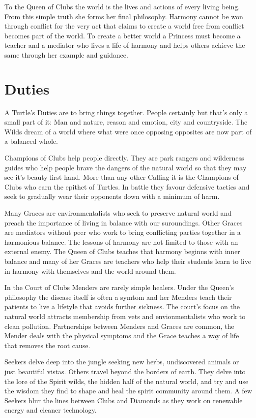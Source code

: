 To the Queen of Clubs the world is the lives and actions of every living being. From this simple truth she forms her final philosophy. Harmony cannot be won through conflict for the very act that claims to create a world free from conflict becomes part of the world. To create a better world a Princess must become a teacher and a mediator who lives a life of harmony and helps others achieve the same through her example and guidance. 

\section*{Duties}

A Turtle's Duties are to bring things together. People certainly but that's only a small part of it: Man and nature, reason and emotion, city and countryside. The Wilds dream of a world where what were once opposing opposites are now part of a balanced whole. 

Champions of Clubs help people directly. They are park rangers and wilderness guides who help people brave the dangers of the natural world so that they may see it's beauty first hand. More than any other Calling it is the Champions of Clubs who earn the epithet of Turtles. In battle they favour defensive tactics and seek to gradually wear their opponents down with a minimum of harm. 

Many Graces are environmentalists who seek to preserve natural world and preach the importance of living in balance with our suroundings. Other Graces are mediators without peer who work to bring conflicting parties together in a harmonious balance. The lessons of harmony are not limited to those with an external enemy. The Queen of Clubs teaches that harmony beginns with inner balance and many of her Graces are teachers who help their students learn to live in harmony with themselves and the world around them. 

In the Court of Clubs Menders are rarely simple healers. Under the Queen's philosophy the disease itself is often a symtom and her Menders teach their patients to live a lifetyle that avoids further sickness. The court's focus on the natural world attracts membership from vets and envionmentalists who work to clean pollution. Partnerships between Menders and Graces are common, the Mender deals with the physical symptoms and the Grace teaches a way of life that removes the root cause. 

Seekers delve deep into the jungle seeking new herbs, undiscovered animals or just beautiful vistas. Others travel beyond the borders of earth. They delve into the lore of the Spirit wilds, the hidden half of the natural world, and try and use the wisdom they find to shape and heal the spirit community around them. A few Seekers blur the lines between Clubs and Diamonds as they work on renewable energy and cleaner technology. 

